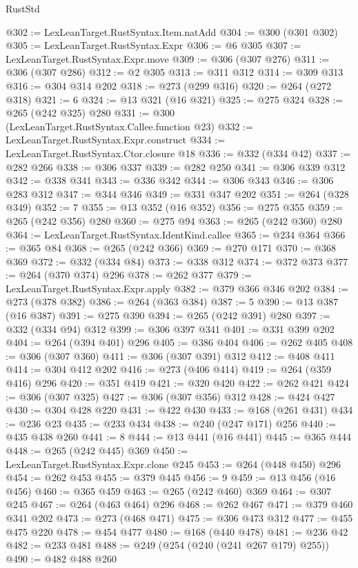 \begin{lexlean}{RustStd}
\begin{coremodule}
@302 := LexLeanTarget.RustSyntax.Item.natAdd
@304 := @300 (@301 @302)
@305 := LexLeanTarget.RustSyntax.Expr
@306 := @6 @305
@307 := LexLeanTarget.RustSyntax.Expr.move
@309 := @306 (@307 @276)
@311 := @306 (@307 @286)
@312 := @2 @305
@313 := @311 @312
@314 := @309 @313
@316 := @304 @314 @202
@318 := @273 (@299 @316)
@320 := @264 (@272 @318)
@321 := 6
@324 := @13 @321 (@16 @321)
@325 := @275 @324
@328 := @265 (@242 @325) @280
@331 := @300 (LexLeanTarget.RustSyntax.Callee.function @23)
@332 := LexLeanTarget.RustSyntax.Expr.construct
@334 := LexLeanTarget.RustSyntax.Ctor.closure @18
@336 := @332 (@334 @42)
@337 := @282 @266
@338 := @306 @337
@339 := @282 @250
@341 := @306 @339 @312
@342 := @338 @341
@343 := @336 @342
@344 := @306 @343
@346 := @306 @283 @312
@347 := @344 @346
@349 := @331 @347 @202
@351 := @264 (@328 @349)
@352 := 7
@355 := @13 @352 (@16 @352)
@356 := @275 @355
@359 := @265 (@242 @356) @280
@360 := @275 @94
@363 := @265 (@242 @360) @280
@364 := LexLeanTarget.RustSyntax.IdentKind.callee
@365 := @234 @364
@366 := @365 @84
@368 := @265 (@242 @366)
@369 := @270 @171
@370 := @368 @369
@372 := @332 (@334 @84)
@373 := @338 @312
@374 := @372 @373
@377 := @264 (@370 @374) @296
@378 := @262 @377
@379 := LexLeanTarget.RustSyntax.Expr.apply
@382 := @379 @366 @346 @202
@384 := @273 (@378 @382)
@386 := @264 (@363 @384)
@387 := 5
@390 := @13 @387 (@16 @387)
@391 := @275 @390
@394 := @265 (@242 @391) @280
@397 := @332 (@334 @94) @312
@399 := @306 @397 @341
@401 := @331 @399 @202
@404 := @264 (@394 @401) @296
@405 := @386 @404
@406 := @262 @405
@408 := @306 (@307 @360)
@411 := @306 (@307 @391) @312
@412 := @408 @411
@414 := @304 @412 @202
@416 := @273 (@406 @414)
@419 := @264 (@359 @416) @296
@420 := @351 @419
@421 := @320 @420
@422 := @262 @421
@424 := @306 (@307 @325)
@427 := @306 (@307 @356) @312
@428 := @424 @427
@430 := @304 @428 @220
@431 := @422 @430
@433 := @168 (@261 @431)
@434 := @236 @23
@435 := @233 @434
@438 := @240 (@247 @171) @256
@440 := @435 @438 @260
@441 := 8
@444 := @13 @441 (@16 @441)
@445 := @365 @444
@448 := @265 (@242 @445) @369
@450 := LexLeanTarget.RustSyntax.Expr.clone @245
@453 := @264 (@448 @450) @296
@454 := @262 @453
@455 := @379 @445
@456 := 9
@459 := @13 @456 (@16 @456)
@460 := @365 @459
@463 := @265 (@242 @460) @369
@464 := @307 @245
@467 := @264 (@463 @464) @296
@468 := @262 @467
@471 := @379 @460 @341 @202
@473 := @273 (@468 @471)
@475 := @306 @473 @312
@477 := @455 @475 @220
@478 := @454 @477
@480 := @168 (@440 @478)
@481 := @236 @42
@482 := @233 @481
@488 := @249 (@254 (@240 (@241 @267 @179) @255))
@490 := @482 @488 @260

\end{coremodule}
\end{lexlean}
